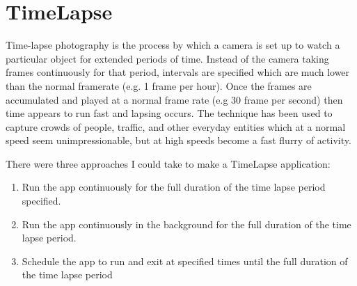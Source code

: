 %
%
%

%

\part{TimeLapse}
Time-lapse photography is the process by which a camera is set up to watch a particular object for extended periods of time. Instead of the camera taking frames continuously for that period, intervals are specified which are much lower than the normal framerate (e.g. 1 frame per hour). Once the frames are accumulated and played at a normal frame rate (e.g 30 frame per second) then time appears to run fast and lapsing occurs.
The technique has been used to capture crowds of people, traffic, and other everyday entities which at a normal speed seem unimpressionable, but at high speeds become a fast flurry of activity.

There were three approaches I could take to make a TimeLapse application:\\
\begin{enumerate}
\vspace{-20pt}
\item Run the app continuously for the full duration of the time lapse period specified.\\
\vspace{-20pt}
\item Run the app continuously in the background for the full duration of the time lapse period.\\
\vspace{-20pt}
\item Schedule the app to run and exit at specified times until the full duration of the time lapse period\\
\vspace{-10pt}
\end{enumerate}

